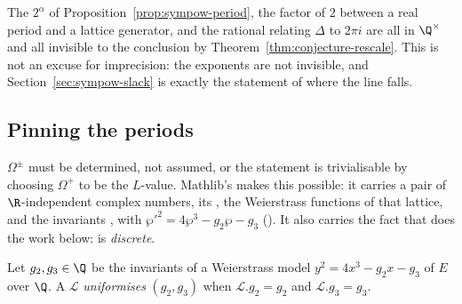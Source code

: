 \begin{remark}
  \label{rem:period-constant}
  The $2^{\alpha}$ of Proposition~\ref{prop:sympow-period}, the factor of $2$ between a real
  period and a lattice generator, and the rational relating $\Delta$ to $2\pi i$ are all in
  $\Q^{\times}$ and all invisible to the conclusion by
  Theorem~\ref{thm:conjecture-rescale}. This is not an excuse for imprecision: the exponents
  are not invisible, and Section~\ref{sec:sympow-slack} is exactly the statement of where the
  line falls.
\end{remark}

\subsection{Pinning the periods}

$\Omega^{\pm}$ must be determined, not assumed, or the statement is trivialisable by choosing
$\Omega^{+}$ to be the $L$-value. Mathlib's  makes this possible: it carries a
pair of $\R$-independent complex numbers, its , the Weierstrass
functions of that lattice, and the invariants ,  with
$\wp'^{2} = 4\wp^{3} - g_{2}\wp - g_{3}$ (). It also
carries the fact that does the work below:  is \emph{discrete}.

\begin{definition}
  \label{def:sympow-periodLattice}
  Let $g_{2},g_{3} \in \Q$ be the invariants of a Weierstrass model $y^{2}=4x^{3}-g_{2}x-g_{3}$
  of $E$ over $\Q$. A  $\mathcal{L}$ \emph{uniformises} $(g_{2},g_{3})$ when
  $\mathcal{L}.g_{2} = g_{2}$ and $\mathcal{L}.g_{3} = g_{3}$.
\end{definition}

